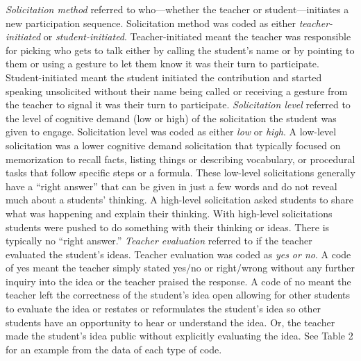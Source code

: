 \documentclass{sig-alternate} %
\begin{document}
\begin{large}
\textit{Solicitation method} referred to who—whether the teacher or student—initiates a new participation sequence. Solicitation method was coded as either \textit{teacher-initiated} or \textit{student-initiated}. Teacher-initiated meant the teacher was responsible for picking who gets to talk either by calling the student’s name or by pointing to them or using a gesture to let them know it was their turn to participate. Student-initiated meant the student initiated the contribution and started speaking unsolicited without their name being called or receiving a gesture from the teacher to signal it was their turn to participate. \textit{Solicitation level} referred to the level of cognitive demand (low or high) of the solicitation the student was given to engage. Solicitation level was coded as either \textit{low} or \textit{high}. A low-level solicitation was a lower cognitive demand solicitation that typically focused on memorization to recall facts, listing things or describing vocabulary, or procedural tasks that follow specific steps or a formula. These low-level solicitations generally have a “right answer” that can be given in just a few words and do not reveal much about a students’ thinking. A high-level solicitation asked students to share what was happening and explain their thinking. With high-level solicitations students were pushed to do something with their thinking or ideas. There is typically no “right answer.” \textit{Teacher evaluation} referred to if the teacher evaluated the student’s ideas. Teacher evaluation was coded as \textit{yes or no}. A code of yes meant the teacher simply stated yes/no or right/wrong without any further inquiry into the idea or the teacher praised the response. A code of no meant the teacher left the correctness of the student's idea open allowing for other students to evaluate the idea or restates or reformulates the student’s idea so other students have an opportunity to hear or understand the idea. Or, the teacher made the student’s idea public without explicitly evaluating the idea. See Table 2 for an example from the data of each type of code. 


\end{large}
\end{document}
